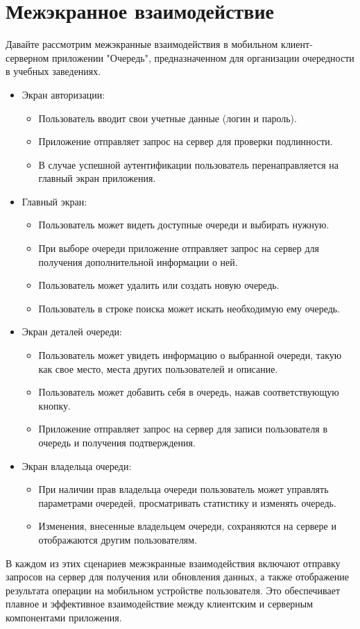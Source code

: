 \section{Межэкранное взаимодействие}

Давайте рассмотрим межэкранные взаимодействия
в мобильном клиент-серверном приложении "Очередь",
предназначенном для организации очередности в учебных заведениях.

\begin{itemize}
   \item Экран авторизации:
		\begin{itemize}
			\item Пользователь вводит свои учетные данные (логин и пароль).
			\item Приложение отправляет запрос на сервер
				для проверки подлинности.
			\item В случае успешной аутентификации пользователь
				перенаправляется на главный экран приложения.
		\end{itemize}
   \item Главный экран:
		\begin{itemize}
			\item Пользователь может видеть доступные очереди
				и выбирать нужную.
			\item При выборе очереди приложение отправляет запрос
				на сервер для получения дополнительной информации о ней.
			\item Пользователь может удалить или создать новую очередь.
			\item Пользователь в строке поиска может
				искать необходимую ему очередь.
		\end{itemize}
   \item Экран деталей очереди:
		\begin{itemize}
			\item Пользователь может увидеть информацию о выбранной очереди,
				такую как свое место, места других пользователей и описание.
			\item Пользователь может добавить себя в очередь,
				нажав соответствующую кнопку.
			\item Приложение отправляет запрос на сервер
				для записи пользователя в очередь и получения подтверждения.
		\end{itemize}
   \item Экран владельца очереди:
		\begin{itemize}
			\item При наличии прав владельца очереди пользователь
				может управлять параметрами очередей,
				просматривать статистику и изменять очередь.
			\item Изменения, внесенные владельцем очереди,
				сохраняются на сервере и отображаются другим пользователям.
		\end{itemize}
\end{itemize}

В каждом из этих сценариев межэкранные взаимодействия включают отправку
запросов на сервер для получения или обновления данных,
а также отображение результата операции на мобильном устройстве пользователя.
Это обеспечивает плавное и эффективное взаимодействие
между клиентским и серверным компонентами приложения.

